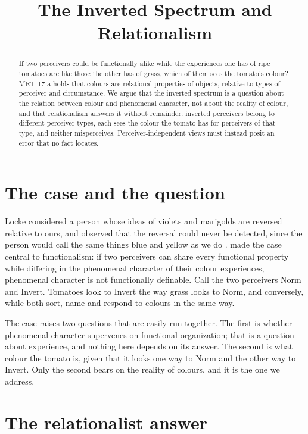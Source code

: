 \documentclass{situationist-preprint}
\title{The Inverted Spectrum and Relationalism}
\begin{document}
\maketitle

\begin{abstract}
If two perceivers could be functionally alike while the experiences one has of ripe tomatoes are like those the other has of grass, which of them sees the tomato's colour? MET-17-a holds that colours are relational properties of objects, relative to types of perceiver and circumstance. We argue that the inverted spectrum is a question about the relation between colour and phenomenal character, not about the reality of colour, and that relationalism answers it without remainder: inverted perceivers belong to different perceiver types, each sees the colour the tomato has for perceivers of that type, and neither misperceives. Perceiver-independent views must instead posit an error that no fact locates.
\end{abstract}

\section{The case and the question}

Locke considered a person whose ideas of violets and marigolds are reversed relative to ours, and observed that the reversal could never be detected, since the person would call the same things blue and yellow as we do \citep[II.xxxii.15]{Locke1690}. \citet{Shoemaker1982} made the case central to functionalism: if two perceivers can share every functional property while differing in the phenomenal character of their colour experiences, phenomenal character is not functionally definable. Call the two perceivers Norm and Invert. Tomatoes look to Invert the way grass looks to Norm, and conversely, while both sort, name and respond to colours in the same way.

The case raises two questions that are easily run together. The first is whether phenomenal character supervenes on functional organization; that is a question about experience, and nothing here depends on its answer. The second is what colour the tomato is, given that it looks one way to Norm and the other way to Invert. Only the second bears on the reality of colours, and it is the one we address.

\section{The relationalist answer}
\end{document}
